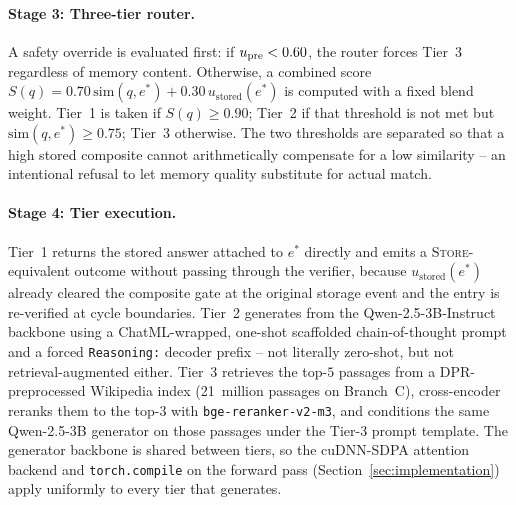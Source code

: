\paragraph{Stage 3: Three-tier router.}
A safety override is evaluated first: if $u_{\text{pre}} < 0.60$, the router forces Tier~3 regardless of memory content. Otherwise, a combined score $S(q) = 0.70\,\mathrm{sim}(q, e^{*}) + 0.30\,u_{\text{stored}}(e^{*})$ is computed with a fixed blend weight. Tier~1 is taken if $S(q) \geq 0.90$; Tier~2 if that threshold is not met but $\mathrm{sim}(q, e^{*}) \geq 0.75$; Tier~3 otherwise. The two thresholds are separated so that a high stored composite cannot arithmetically compensate for a low similarity -- an intentional refusal to let memory quality substitute for actual match.

\paragraph{Stage 4: Tier execution.}
Tier~1 returns the stored answer attached to $e^{*}$ directly and emits a \textsc{Store}-equivalent outcome without passing through the verifier, because $u_{\text{stored}}(e^{*})$ already cleared the composite gate at the original storage event and the entry is re-verified at cycle boundaries. Tier~2 generates from the Qwen-2.5-3B-Instruct backbone using a ChatML-wrapped, one-shot scaffolded chain-of-thought prompt and a forced \texttt{Reasoning:} decoder prefix -- not literally zero-shot, but not retrieval-augmented either. Tier~3 retrieves the top-$5$ passages from a DPR-preprocessed Wikipedia index (21~million passages on Branch~C), cross-encoder reranks them to the top-$3$ with \texttt{bge-reranker-v2-m3}, and conditions the same Qwen-2.5-3B generator on those passages under the Tier-3 prompt template. The generator backbone is shared between tiers, so the cuDNN-SDPA attention backend and \texttt{torch.compile} on the forward pass (Section~\ref{sec:implementation}) apply uniformly to every tier that generates.

